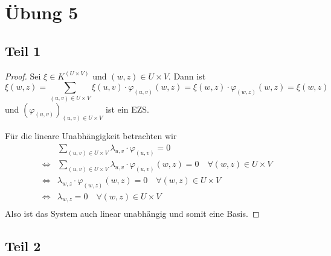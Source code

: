 \documentclass[10pt,a4paper]{article}
\begin{document}
\section*{Übung 5}

\subsection*{Teil 1}

\begin{proof}
Sei $\xi \in K^{(U \times V)}$ und $(w, z) \in U \times V$.
Dann ist
\begin{equation}
\xi(w, z) = \sum_{(u, v) \in U \times V} \xi(u, v) \cdot \varphi_{(u, v)}(w, z) = \xi(w, z) \cdot \varphi_{(w, z)}(w, z) = \xi(w, z)
\end{equation}
und $(\varphi_{(u, v)})_{(u, v) \in U \times V}$ ist ein EZS.

Für die lineare Unabhängigkeit betrachten wir
\begin{align}
& \sum_{(u, v) \in U \times V} \lambda_{u, v} \cdot \varphi_{(u, v)} = 0\\
\Leftrightarrow & \sum_{(u, v) \in U \times V} \lambda_{u, v} \cdot \varphi_{(u, v)}(w, z) = 0 \quad \forall (w, z) \in U \times V\\
\Leftrightarrow & \lambda_{w, z} \cdot \varphi_{(w, z)}(w, z) = 0 \quad \forall (w, z) \in U \times V\\
\Leftrightarrow & \lambda_{w, z} = 0 \quad \forall (w, z) \in U \times V\\
\end{align}
Also ist das System auch linear unabhängig und somit eine Basis.
\end{proof}

\subsection*{Teil 2}
\end{document}
